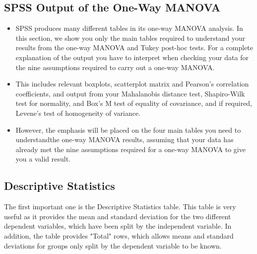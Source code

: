 \documentclass[a4paper,12pt]{article}
\begin{document}
%
%
%
%
%
%


\subsection{SPSS Output of the One-Way MANOVA}
\begin{itemize}
	\item SPSS produces many different tables in its one-way MANOVA analysis. In this section, we show you only the main tables required to understand your results from the one-way MANOVA and Tukey post-hoc tests. For a complete explanation of the output you have to interpret when checking your data for the nine assumptions required to carry out a one-way MANOVA. 
	
	\item This includes relevant boxplots, scatterplot matrix and Pearson's correlation coefficients, and output from your Mahalanobis distance test, Shapiro-Wilk test for normality, and Box's M test of equality of covariance, and if required, Levene's test of homogeneity of variance.
	
	\item However, the emphasis will be placed on the four main tables you need to understandthe one-way MANOVA results, assuming that your data has already met the nine assumptions required for a one-way MANOVA to give you a valid result.
\end{itemize}




\subsection{Descriptive Statistics}
The first important one is the Descriptive Statistics table. This table is very useful as it provides the mean and standard deviation for the two different dependent variables, which have been split by the independent variable. In addition, the table provides "Total" rows, which allows means and standard deviations for groups only split by the dependent variable to be known.
\end{document}
